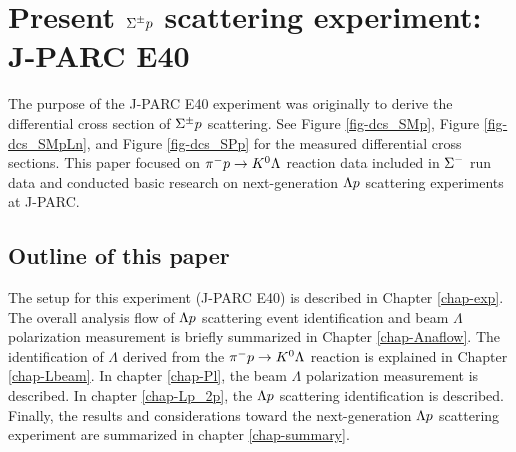 \clearpage
\section{Present $\Sigma^{\pm}p$ scattering experiment: \\J-PARC E40}
The purpose of the J-PARC E40 experiment was originally to derive the differential cross section of $\Sigma^{\pm}p$ scattering. See Figure \ref{fig-dcs_SMp}, Figure \ref{fig-dcs_SMpLn}, and Figure \ref{fig-dcs_SPp} for the measured differential cross sections. This paper focused on $\pi^- p \to K^0 \Lambda$ reaction data included in $\Sigma^{-}$ run data and conducted basic research on next-generation $\Lambda p$ scattering experiments at J-PARC.

\subsection{Outline of this paper}
The setup for this experiment (J-PARC E40) is described in Chapter \ref{chap-exp}. The overall analysis flow of $\Lambda p$ scattering event identification and beam $\Lambda$ polarization measurement is briefly summarized in Chapter \ref{chap-Anaflow}. The identification of $\Lambda$ derived from the $\pi^- p \to K^0 \Lambda$ reaction is explained in Chapter \ref{chap-Lbeam}. In chapter \ref{chap-Pl}, the beam $\Lambda$ polarization measurement is described. In chapter \ref{chap-Lp_2p}, the $\Lambda p$ scattering identification is described. Finally, the results and considerations toward the next-generation $\Lambda p$ scattering experiment are summarized in chapter \ref{chap-summary}.


